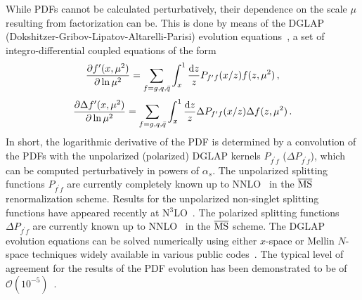 While PDFs cannot be calculated perturbatively, their dependence on the scale 
$\mu$ resulting from factorization can be.
%
This is done by means of the
DGLAP (Dokshitzer-Gribov-Lipatov-Altarelli-Parisi) 
evolution equations~\cite{Dokshitzer:1977sg,Gribov:1972ri,Altarelli:1977zs},
a set of integro-differential coupled equations of the form
\begin{equation}
  \label{eq:dglapunp}
\frac{\partial f^\prime(x,\mu^2)}{\partial \ln \mu^2}
=
\sum_{f=g,q,\bar{q}}\int_x^1 
\frac{{\rm d}z}{z}P_{f^\prime f}(x/z)f(z,\mu^2)\, ,
\end{equation}
%
\begin{equation}
  \label{eq:dglappol}
\frac{\partial \Delta f^\prime(x,\mu^2)}{\partial \ln \mu^2}
=
\sum_{f=g,q,\bar{q}}\int_x^1 
\frac{{\rm d}z}{z}\Delta P_{f^\prime f}(x/z)\Delta f(z,\mu^2)\, .
\end{equation}
%
In short, the logarithmic derivative of the PDF is determined by a convolution
of the PDFs with the unpolarized (polarized) DGLAP kernels $P_{f^\prime f}$
($\Delta P_{f^\prime f}$), which can be 
computed perturbatively in powers of $\alpha_{s}$.
%
The unpolarized splitting functions $P_{f^\prime f}$ are currently completely 
known up to NNLO~\cite{Moch:2004pa,Vogt:2004mw} in the $\overline{\rm MS}$ 
renormalization scheme.
%
Results for the unpolarized non-singlet splitting functions have appeared 
recently at N$^3$LO~\cite{Davies:2016jie,Moch:2017uml}.
%
The polarized splitting functions $\Delta P_{f^\prime f}$ are currently known 
up to  NNLO~\cite{Moch:2014sna} in the $\overline{\rm MS}$ scheme.
%
The DGLAP evolution equations can be solved numerically using
either $x$-space or Mellin $N$-space techniques widely available in various
public codes~\cite{Vogt:2004ns,Salam:2008qg,Botje:2010ay,
Bertone:2013vaa,Bertone:2015cwa}.
%
The typical level of agreement for the results of the PDF evolution 
has been demonstrated to be of 
$\mathcal{O}(10^{-5})$~\cite{Giele:2002hx,Dittmar:2005ed}.

%
%
%
%

